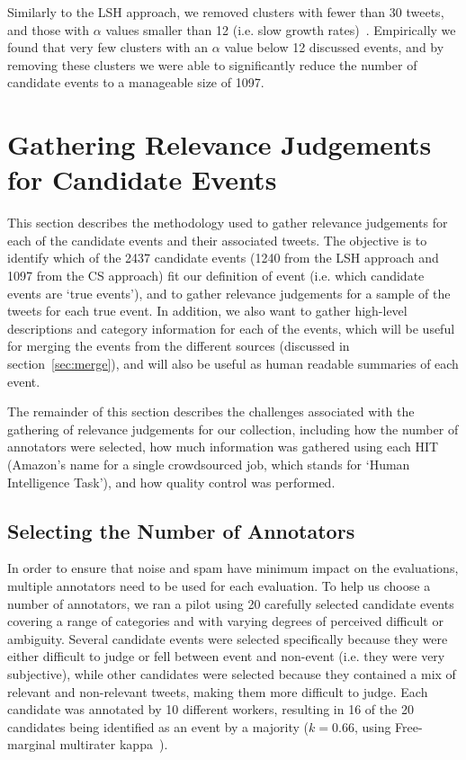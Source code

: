 Similarly to the LSH approach, we removed clusters with fewer than 30 tweets, and those with \(\alpha\) values smaller than 12  (i.e. slow growth rates)~\citep{Aggarwal12}.
Empirically we found that very few clusters with an \(\alpha\) value below 12 discussed events, and by removing these clusters we were able to significantly reduce the number of candidate events to a manageable size of 1097.

\section{Gathering Relevance Judgements for Candidate Events}
This section describes the methodology used to gather relevance judgements for each of the candidate events and their associated tweets.
The objective is to identify which of the 2437 candidate events (1240 from the LSH approach and 1097 from the CS approach) fit our definition of event (i.e. which candidate events are `true events'), and to gather relevance judgements for a sample of the tweets for each true event.
In addition, we also want to gather high-level descriptions and category information for each of the events, which will be useful for merging the events from the different sources (discussed in section~\ref{sec:merge}), and will also be useful as human readable summaries of each event.

The remainder of this section describes the challenges associated with the gathering of relevance judgements for our collection, including how the number of annotators were selected, how much information was gathered using each HIT (Amazon's name for a single crowdsourced job, which stands for `Human Intelligence Task'), and how quality control was performed.

\subsection{Selecting the Number of Annotators}
\label{sec:numAnnotators}
In order to ensure that noise and spam have minimum impact on the evaluations, multiple annotators need to be used for each evaluation.
To help us choose a number of annotators, we ran a pilot using 20 carefully selected candidate events covering a range of categories and with varying degrees of perceived difficult or ambiguity.
Several candidate events were selected specifically because they were either difficult to judge or fell between event and non-event (i.e. they were very subjective), while other candidates were selected because they contained a mix of relevant and non-relevant tweets, making them more difficult to judge.
Each candidate was annotated by 10 different workers, resulting in 16 of the 20 candidates being identified as an event by a majority (\(k = 0.66\), using Free-marginal multirater kappa~\citep{Randolph}).

